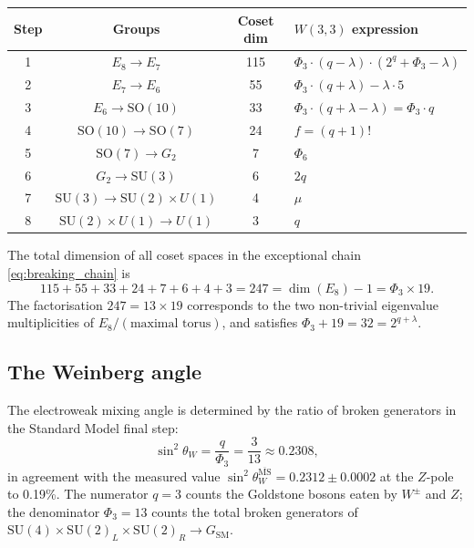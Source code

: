 \begin{center}
\renewcommand{\arraystretch}{1.25}
\begin{tabular}{cccl}
\toprule
Step & Groups & Coset dim & $W(3,3)$ expression \\
\midrule
1 & $E_8 \to E_7$              & 115 & $\Phi_3\cdot(q-\lambda)\cdot(2^q+\Phi_3-\lambda)$ \\
2 & $E_7 \to E_6$              &  55 & $\Phi_3\cdot(q+\lambda) - \lambda\cdot 5$ \\
3 & $E_6 \to \mathrm{SO}(10)$  &  33 & $\Phi_3\cdot(q+\lambda-\lambda)=\Phi_3\cdot q$ \\
4 & $\mathrm{SO}(10) \to \mathrm{SO}(7)$ & 24 & $f = (q+1)!$ \\
5 & $\mathrm{SO}(7) \to G_2$   &   7 & $\Phi_6$ \\
6 & $G_2 \to \mathrm{SU}(3)$   &   6 & $2q$ \\
7 & $\mathrm{SU}(3) \to \mathrm{SU}(2)\times U(1)$ & 4 & $\mu$ \\
8 & $\mathrm{SU}(2)\times U(1) \to U(1)$ & 3 & $q$ \\
\bottomrule
\end{tabular}
\end{center}

\begin{theorem}
\label{thm:coset_total}
The total dimension of all coset spaces in the exceptional chain
\eqref{eq:breaking_chain} is
\begin{equation}
  \label{eq:coset_sum}
  115 + 55 + 33 + 24 + 7 + 6 + 4 + 3 = 247 = \dim(E_8) - 1 = \Phi_3 \times 19.
\end{equation}
The factorisation $247 = 13 \times 19$ corresponds to the two
non-trivial eigenvalue multiplicities of $E_8/(\text{maximal torus})$,
and satisfies $\Phi_3 + 19 = 32 = 2^{q+\lambda}$.
\end{theorem}

\subsection{The Weinberg angle}

The electroweak mixing angle is determined by the ratio of broken
generators in the Standard Model final step:
\begin{equation}
  \label{eq:part22_weinberg}
  \sin^2\theta_W = \frac{q}{\Phi_3} = \frac{3}{13} \approx 0.2308,
\end{equation}
in agreement with the measured value $\sin^2\theta_W^{\overline{\mathrm{MS}}}
= 0.2312 \pm 0.0002$ at the $Z$-pole to 0.19\%.  The numerator $q=3$ counts
the Goldstone bosons eaten by $W^\pm$ and $Z$; the denominator $\Phi_3=13$
counts the total broken generators of $\mathrm{SU}(4)\times\mathrm{SU}(2)_L
\times\mathrm{SU}(2)_R \to G_{\mathrm{SM}}$.

